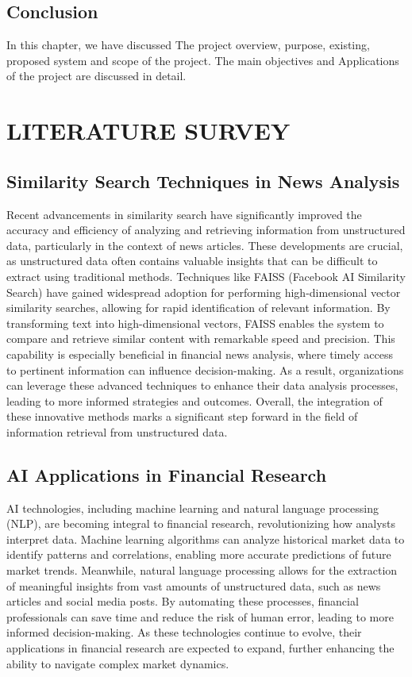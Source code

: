 \documentclass[12pt,a4paper]{report}
\begin{document}
{\section{Conclusion}
In this chapter, we have discussed The project overview, purpose, existing, proposed system and scope of the project. The main objectives and Applications of the project are discussed in detail.

\newpage

\chapter{LITERATURE SURVEY}
\section{Similarity Search Techniques in News Analysis}
Recent advancements in similarity search have significantly improved the accuracy and efficiency of analyzing and retrieving information from unstructured data, particularly in the context of news articles. These developments are crucial, as unstructured data often contains valuable insights that can be difficult to extract using traditional methods. Techniques like FAISS (Facebook AI Similarity Search) have gained widespread adoption for performing high-dimensional vector similarity searches, allowing for rapid identification of relevant information. By transforming text into high-dimensional vectors, FAISS enables the system to compare and retrieve similar content with remarkable speed and precision. This capability is especially beneficial in financial news analysis, where timely access to pertinent information can influence decision-making. As a result, organizations can leverage these advanced techniques to enhance their data analysis processes, leading to more informed strategies and outcomes. Overall, the integration of these innovative methods marks a significant step forward in the field of information retrieval from unstructured data.
\section{AI Applications in Financial Research}
AI technologies, including machine learning and natural language processing (NLP), are becoming integral to financial research, revolutionizing how analysts interpret data. Machine learning algorithms can analyze historical market data to identify patterns and correlations, enabling more accurate predictions of future market trends. Meanwhile, natural language processing allows for the extraction of meaningful insights from vast amounts of unstructured data, such as news articles and social media posts. By automating these processes, financial professionals can save time and reduce the risk of human error, leading to more informed decision-making. As these technologies continue to evolve, their applications in financial research are expected to expand, further enhancing the ability to navigate complex market dynamics.
}
\end{document}
